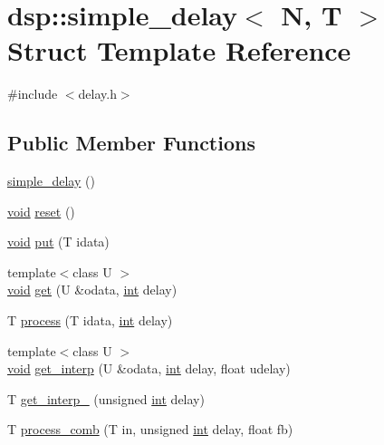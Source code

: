 \hypertarget{structdsp_1_1simple__delay}{}\section{dsp\+:\+:simple\+\_\+delay$<$ N, T $>$ Struct Template Reference}
\label{structdsp_1_1simple__delay}


{\ttfamily \#include $<$delay.\+h$>$}

\subsection*{Public Member Functions}
\begin{DoxyCompactItemize}
\item 
\hyperlink{structdsp_1_1simple__delay_a0d885e9f04535c0cb64e0759575b10b8}{simple\+\_\+delay} ()
\item 
\hyperlink{tk_8h_aba408b7cd755a96426e004c015f5de8e}{void} \hyperlink{structdsp_1_1simple__delay_a79ac7019946026e74da39e7dc7a7a7cd}{reset} ()
\item 
\hyperlink{tk_8h_aba408b7cd755a96426e004c015f5de8e}{void} \hyperlink{structdsp_1_1simple__delay_a98fae2630863b66ce1dec93013ef7b95}{put} (T idata)
\item 
{\footnotesize template$<$class U $>$ }\\\hyperlink{tk_8h_aba408b7cd755a96426e004c015f5de8e}{void} \hyperlink{structdsp_1_1simple__delay_a8951d40b34a7d30c5f335c5a038c1510}{get} (U \&odata, \hyperlink{tk_8h_a83f82f76e7fed06f4c49d2db94028a6d}{int} delay)
\item 
T \hyperlink{structdsp_1_1simple__delay_a9233f169d46f095332f0da73ee59d323}{process} (T idata, \hyperlink{tk_8h_a83f82f76e7fed06f4c49d2db94028a6d}{int} delay)
\item 
{\footnotesize template$<$class U $>$ }\\\hyperlink{tk_8h_aba408b7cd755a96426e004c015f5de8e}{void} \hyperlink{structdsp_1_1simple__delay_adeff2bb309485a26d002405bd8459231}{get\+\_\+interp} (U \&odata, \hyperlink{tk_8h_a83f82f76e7fed06f4c49d2db94028a6d}{int} delay, float udelay)
\item 
T \hyperlink{structdsp_1_1simple__delay_a768cbffd6111bcfc2762c8f98de9e8ae}{get\+\_\+interp\+\_} (unsigned \hyperlink{tk_8h_a83f82f76e7fed06f4c49d2db94028a6d}{int} delay)
\item 
T \hyperlink{structdsp_1_1simple__delay_ada1a70652c9018d3c12e1387212aba48}{process\+\_\+comb} (T in, unsigned \hyperlink{tk_8h_a83f82f76e7fed06f4c49d2db94028a6d}{int} delay, float fb)

\end{DoxyCompactItemize}
